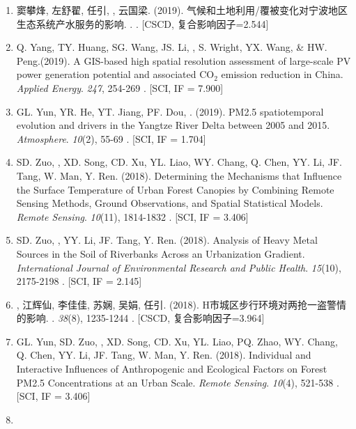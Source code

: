 \begin{enumerate}
\item
    窦攀烽, 左舒翟, 任引, {}, 云国梁. (2019).
    气候和土地利用/覆被变化对宁波地区生态系统产水服务的影响.
    {}. %
    {}. [CSCD, 复合影响因子=2.544] %
\item
    Q. Yang, TY. Huang, SG. Wang, JS. Li, \Shaoqing, S. Wright, YX. Wang, \& HW. Peng.(2019).
    A GIS-based high spatial resolution assessment of large-scale PV power generation potential and associated CO$_2$ emission reduction in China.
    \textit{Applied Energy}. \textit{247}, 254-269
    . [SCI, IF = 7.900]
\item
    GL. Yun, YR. He, YT. Jiang, PF. Dou, \Shaoqing. (2019).
    PM2.5 spatiotemporal evolution and drivers in the Yangtze River Delta between 2005 and 2015.
    \textit{Atmosphere}. \textit{10}(2), 55-69
    . [SCI, IF = 1.704]
\item
    SD. Zuo, \Shaoqing, XD. Song, CD. Xu, YL. Liao, WY. Chang, Q. Chen, YY. Li, JF. Tang, W. Man, Y. Ren. (2018).
    Determining the Mechanisms that Influence the Surface Temperature of Urban Forest Canopies by Combining Remote Sensing Methods, Ground Observations, and Spatial Statistical Models. 
    \textit{Remote Sensing}. \textit{10}(11), 1814-1832
    . [SCI, IF = 3.406]
\item
    SD. Zuo, \Shaoqing, YY. Li, JF. Tang, Y. Ren. (2018).
	Analysis of Heavy Metal Sources in the Soil of Riverbanks Across an Urbanization Gradient.
    \textit{International Journal of Environmental Research and Public Health}. \textit{15}(10), 2175-2198
    . [SCI, IF = 2.145]
\item
    {}, 江辉仙, 李佳佳, 苏娴, 吴娟, 任引. (2018).
	H市城区步行环境对两抢一盗警情的影响.
    {}.  \textit{38}(8), 1235-1244
    . [CSCD, 复合影响因子=3.964]
\item
    GL. Yun, SD. Zuo, \Shaoqing, XD. Song, CD. Xu, YL. Liao, PQ. Zhao, WY. Chang, Q. Chen, YY. Li, JF. Tang, W. Man, Y. Ren. (2018).
	Individual and Interactive Influences of Anthropogenic and Ecological Factors on Forest PM2.5 Concentrations at an Urban Scale.
    \textit{Remote Sensing}. \textit{10}(4), 521-538
    . [SCI, IF = 3.406]
\item

\end{enumerate}
